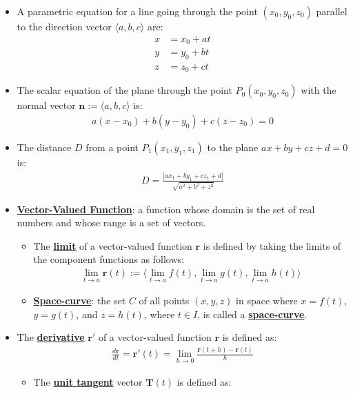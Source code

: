 \documentclass[reqno,11pt]{amsart}
\theoremstyle{definition}
\theoremstyle{remark}
\newcommand{\dfn}[1]{\underline{\textbf{#1}}}
\begin{document}
\begin{itemize}[noitemsep]
\begin{itemize}[noitemsep]
	\end{itemize}
	\item A parametric equation for a line going through the point $(x_0, y_0, z_0)$ parallel to the direction vector $\langle a, b, c \rangle $ are: 
	\begin{align*}
		x & = x_0 + at \\
		y & = y_0 + bt \\
		z & = z_0 + ct 
	\end{align*}
	\item The scalar equation of the plane through the point $P_0(x_0, y_0, z_0) $ with the normal vector $\mathbf{n} := \langle a, b, c \rangle$ is: 
	\begin{align}
		a(x-x_0) + b(y-y_0) + c(z-z_0) = 0 	
	\end{align}
	\item The distance $D$ from a point $P_1(x_1, y_1, z_1)$ to the plane $ax+ by + cz + d =0$ is: 
	\begin{align}
		D = \frac{|ax_1 + by_1 + cz_1 + d |}{\sqrt{a^2 + b^2 + z^2}}	
	\end{align}
	\item \dfn{Vector-Valued Function}: a function whose domain is the set of real numbers and whose range is a set of vectors. 
	\begin{itemize}[noitemsep]
		\item The \dfn{limit} of a vector-valued function $\mathbf{r}$ is defined by taking the limits of the component functions as follows: 
		\begin{align}
			\lim_{ t \rightarrow a} \mathbf{r}(t) := \langle \lim_{t \rightarrow a} f(t), 	\lim_{t \rightarrow a} g(t), \lim_{t \rightarrow a} h(t) \rangle 
		\end{align}
	\item \dfn{Space-curve}: the set $C$ of all points $(x,y,z)$ in space where $x= f(t)$, $y=g(t)$, and $z = h(t)$, where $t \in I$, is called a \dfn{space-curve}. 
	\end{itemize}
	\item The \dfn{derivative} $\mathbf{r}'$ of a vector-valued function $\mathbf{r}$ is defined as: 
	\begin{align}
		\frac{d \mathbf{r}}{dt} = \mathbf{r}'(t) = \lim_{h \rightarrow 0} \frac{\mathbf{r}(t+h) - \mathbf{r}(t)}{h}	
	\end{align}
	\begin{itemize}
		\item The \dfn{unit tangent} vector $\mathbf{T}(t)$ is defined as:
		\begin{align}

\end{align}
\end{itemize}
\end{itemize}
\end{document}
